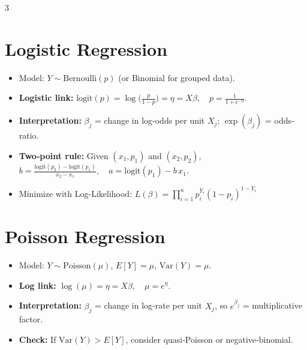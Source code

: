 \documentclass[10pt,landscape]{article}
\begin{document}
\begin{multicols}{3}
\section{Logistic Regression}
\begin{itemize}
  \item Model: $Y\sim\mathrm{Bernoulli}(p)$ (or Binomial for grouped data).
  \item \textbf{Logistic link:} $\displaystyle\text{logit}(p)=\log\bigl(\tfrac{p}{1-p}\bigr)=\eta=X\beta,\quad p=\tfrac{1}{1+e^{-\eta}}$.
  \item \textbf{Interpretation:} $\beta_j$ = change in log‐odds per unit $X_j$; $\exp(\beta_j)$ = odds‐ratio.
  \item \textbf{Two‐point rule:} Given $(x_1,p_1)$ and $(x_2,p_2)$, $\displaystyle b = \frac{\mathrm{logit}(p_2)-\mathrm{logit}(p_1)}{x_2-x_1},\quad a = \mathrm{logit}(p_1) - b\,x_1.$
  \item Minimize with Log-Likelihood: $L(\beta) = \prod_{i=1}^n p_i^{Y_i}(1-p_i)^{1-Y_i}$
\end{itemize}

\section{Poisson Regression}
\begin{itemize}
  \item Model: $Y \sim \mathrm{Poisson}(\mu)$, $E[Y]=\mu$, $\mathrm{Var}(Y)=\mu$.
  \item \textbf{Log link:} $\displaystyle \log(\mu) = \eta = X\beta,\quad \mu=e^\eta$.
  \item \textbf{Interpretation:} $\beta_j$ = change in log‐rate per unit $X_j$, so $e^{\beta_j}$ = multiplicative factor.
  \item \textbf{Check:} If $\mathrm{Var}(Y) > E[Y]$, consider quasi‐Poisson or negative‐binomial.
\end{itemize}


\end{multicols}
\end{document}
